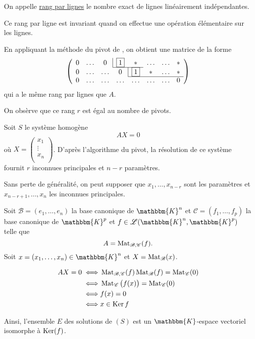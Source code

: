 \begin{prv}
	On appelle \underline{rang par lignes} le nombre exact de lignes linéairement indépendantes.
	
	Ce rang par ligne est invariant quand on effectue une opération élémentaire sur les lignes.

	En appliquant la méthode du pivot de \Gauss, on obtient une matrice de la forme \[
		\left(\begin{array}{c c c c c c c c}
				0&\ldots&0&\multicolumn{1}{|c}{\bx1} & * & \ldots &\ldots& *\\ \cline{4-5}
				0&\ldots&\ldots&0&\multicolumn{1}{|c}{\bx1} & * & \ldots & *\\ \cline{5-8}
				0&\ldots&\ldots&\ldots&\ldots&\ldots&\ldots&0\\
		\end{array}\right)
	\] qui a le même rang par lignes que $A$.

	On obsèrve que ce rang $r$ est égal au nombre de pivots.

	Soit $S$ le système homogène \[
		AX = 0
	\] où $X = \begin{pmatrix}
		x_1\\
		\vdots\\
		x_n\\
	\end{pmatrix}$. D'après l'algorithme du pivot, la résolution de ce système fournit $r$ inconnues principales et $n-r$ paramètres.

	Sans perte de généralité, on peut supposer que $x_1, \ldots, x_{n-r}$ sont les paramètres et $x_{n-r+1},\ldots, x_n$ les inconnues principales.

	Soit $\mathcal{B}=(e_1, \ldots, e_n)$ la base canonique de $\mathbbm{K}^n$ et $\mathcal{C} = (f_1, \ldots, f_p)$ la base canonique de $\mathbbm{K}^p$ et $f \in \mathcal{L}(\mathbbm{K}^n, \mathbbm{K}^p)$ telle que \[
		A = \operatorname{Mat}_{\mathcal{B},\mathcal{C}}(f)
	.\]
	Soit $x = (x_1, \ldots, x_n) \in \mathbbm{K}^n$ et $X = \operatorname{Mat}_\mathcal{B}(x)$.

	\begin{align*}
		AX = 0 \iff& \operatorname{Mat}_{\mathcal{B}, \mathcal{C}}(f) \operatorname{Mat}_\mathcal{B}(f) = \operatorname{Mat}_\mathcal{C}(0)\\
		\iff& \operatorname{Mat}_\mathcal{C}\big(f(x)\big) = \operatorname{Mat}_\mathcal{C}(0)\\
		\iff& f(x) = 0\\
		\iff& x \in \operatorname{Ker} f
	\end{align*}

	Ainsi, l'ensemble $E$ des solutions de $(S)$ est un $\mathbbm{K}$-espace vectoriel isomorphe à $\operatorname{Ker}(f)$.


\end{prv}
